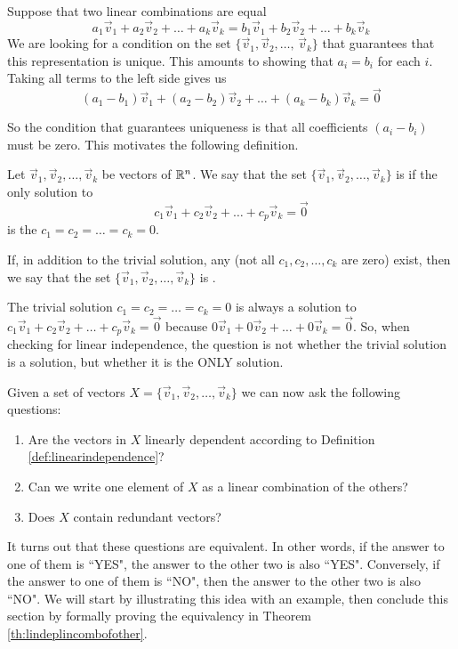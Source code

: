 \documentclass{ximera}
\begin{document}
Suppose that two linear combinations are equal
 $$a_1\vec{v}_1+a_2\vec{v}_2+\dots +a_k\vec{v}_k=b_1\vec{v}_1+b_2\vec{v}_2+\dots +b_k\vec{v}_k$$ 
We are looking for a condition on the set $\{\vec{v}_1, \vec{v}_2,\dots ,\,\vec{v}_k\}$ that guarantees that this representation is unique.  This amounts to showing that $a_i=b_i$ for each $i$.  Taking all terms to the left side gives us
$$(a_1-b_1)\vec{v}_1+(a_2-b_2)\vec{v}_2+\dots +(a_k-b_k)\vec{v}_k=\vec{0}$$

So the condition that guarantees uniqueness is that all coefficients $(a_i-b_i)$ must be zero.  This motivates the following definition.

\begin{definition}\label{def:linearindependence}
Let $\vec{v}_1, \vec{v}_2,\ldots ,\vec{v}_k$ be vectors of $\mathbb{R}^n$.  We say that the set $\{\vec{v}_1, \vec{v}_2,\ldots ,\vec{v}_k\}$ is  if the only solution to 
\begin{equation}\label{eq:defLinInd}c_1\vec{v}_1+c_2\vec{v}_2+\ldots +c_p\vec{v}_k=\vec{0}\end{equation}
is the  $c_1=c_2=\ldots =c_k=0$.

If, in addition to the trivial solution, any  (not all $c_1, c_2,\ldots ,c_k$ are zero) exist, then we say that the set $\{\vec{v}_1, \vec{v}_2,\ldots ,\vec{v}_k\}$ is .
\end{definition}

\begin{observation}
The trivial solution $c_1=c_2=\ldots =c_k=0$ is always a solution to $c_1\vec{v}_1+c_2\vec{v}_2+\ldots +c_p\vec{v}_k=\vec{0}$ because $0\vec{v}_1+0\vec{v}_2+\ldots +0\vec{v}_k=\vec{0}$. So, when checking for linear independence, the question is not whether the trivial solution is a solution, but whether it is the ONLY solution.
\end{observation}

\begin{remark}\label{remark:LinIndEquiv}
Given a set of vectors $X=\{\vec{v}_1,\vec{v}_2,\dots,\vec{v}_k\}$ we can now ask the following questions:
\begin{enumerate}
\item Are the vectors in $X$ linearly dependent according to Definition \ref{def:linearindependence}?
\item Can we write one element of $X$ as a linear combination of the others?
    \item Does $X$ contain redundant vectors?
\end{enumerate}
It turns out that these questions are equivalent.  In other words, if the answer to one of them is ``YES", the answer to the other two is also ``YES".  Conversely, if the answer to one of them is ``NO", then the answer to the other two is also ``NO".  We will start by illustrating this idea with an example, then conclude this section by formally proving the equivalency in Theorem \ref{th:lindeplincombofother}.
\end{remark}
\end{document}

